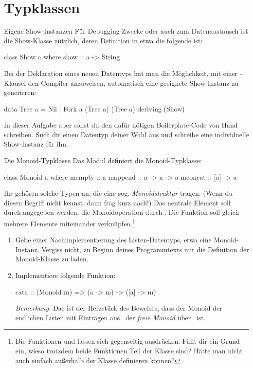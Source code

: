 \documentclass{uebblatt}
\begin{document}
\section{Typklassen}

\begin{aufgabe}{Eigene Show-Instanzen}
Für Debugging-Zwecke oder auch zum Datenaustausch ist die Show-Klasse nützlich,
deren Definition in etwa die folgende ist:
\begin{haskellcode}
class Show a where
    show :: a -> String
\end{haskellcode}
Bei der Deklaration eines neuen Datentyps hat man die Möglichkeit, mit einer
-Klausel den Compiler anzuweisen, automatisch eine
geeignete Show-Instanz zu generieren:
\begin{haskellcode}
data Tree a = Nil | Fork a (Tree a) (Tree a)
    deriving (Show)
\end{haskellcode}
In dieser Aufgabe aber sollst du den dafür nötigen Boilerplate-Code von Hand
schreiben. Such dir einen Datentyp deiner Wahl aus und schreibe eine
individuelle Show-Instanz für ihn.
\end{aufgabe}

\begin{aufgabe}{Die Monoid-Typklasse}
Das Modul  definiert die Monoid-Typklasse:
\begin{haskellcode}
class Monoid a where
    mempty  :: a
    mappend :: a -> a -> a
    mconcat :: [a] -> a
\end{haskellcode}
Ihr gehören solche Typen an, die eine sog. \emph{Monoidstruktur} tragen. (Wenn
du diesen Begriff nicht kennst, dann frag kurz nach!) Das neutrale Element soll
durch  angegeben werden, die Monoidoperation durch
. Die Funktion  soll gleich
mehrere Elemente miteinander verknüpfen.\footnote{Die Funktionen
 und  lassen sich gegenseitig
ausdrücken. Fällt dir ein Grund ein, wieso trotzdem beide Funktionen Teil der
Klasse sind? Hätte man nicht auch einfach  außerhalb der
Klasse definieren können?}

\begin{enumerate}
\item Gebe einer Nachimplementierung des Listen-Datentyps, etwa
 eine Monoid-Instanz.
Vergiss nicht, zu Beginn deines Programmtexts mit  die Definition der Monoid-Klasse zu laden.
\item Implementiere folgende Funktion:
\begin{haskellcode}
cata :: (Monoid m) => (a -> m) -> ([a] -> m)
\end{haskellcode}
{\scriptsize\emph{Bemerkung.} Das ist der Herzstück des Beweises, dass der Monoid
der endlichen Listen mit Einträgen aus~ der \emph{freie
Monoid} über~ ist.\par}
\end{enumerate}
\end{aufgabe}
\end{document}
